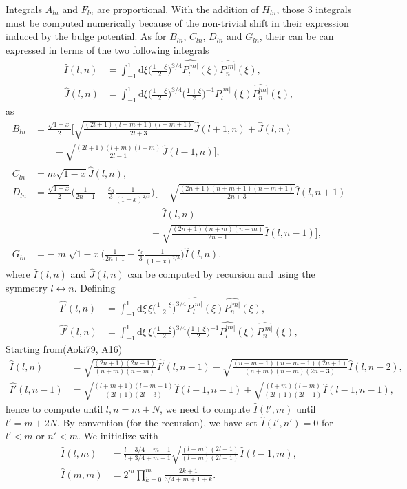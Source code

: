 \documentclass[11pt]{article}
\newcommand{\rd}{\mathrm{d}}
\newcommand{\Pnm}{P_n^{|m|}}
\newcommand{\Plm}{P_l^{|m|}}
\newcommand{\hPnm}{\widehat{\Pnm}}
\newcommand{\hPlm}{\widehat{\Plm}}
\newcommand{\hI}{\widehat{I}}
\newcommand{\hJ}{\widehat{J}}
\newcommand{\hIp}{\widehat{I'}}
\newcommand{\hJp}{\widehat{J'}}
\begin{document}
Integrals $A_{ln}$ and  $F_{ln}$ are proportional. With the addition of $H_{ln}$, those 3 integrals must be computed numerically because of the non-trivial shift in their expression induced by the bulge potential. As for $B_{ln}$, $C_{ln}$, $D_{ln}$ and $G_{ln}$, their can be can expressed in terms of the two following integrals 
\begin{align}
\hI(l,n) &= \int_{-1}^{1} \rd \xi  \bigg(\frac{1-\xi}{2}\bigg)^{3/4} \hPlm(\xi)  \hPnm(\xi), \\
\hJ(l,n) &= \int_{-1}^{1} \rd \xi  \bigg(\frac{1-\xi}{2}\bigg)^{3/4}  \bigg(\frac{1+\xi}{2}\bigg)^{-1}\hPlm(\xi)  \hPnm(\xi) ,
\end{align}
as
\begin{align}
B_{ln} &= \frac{\sqrt{1-x}}{2} \bigg[ \sqrt{\frac{(2l+1)(l+m+1)(l-m+1)}{2l+3}} \hJ(l+1,n)+ \hJ(l,n)\\
&\quad \quad  -\sqrt{\frac{(2l+1)(l+m)(l-m)}{2l-1}} \hJ(l-1,n)\bigg] ,\\
C_{ln} &= m\sqrt{1-x} \hJ(l,n) ,\\
D_{ln} &= \frac{\sqrt{1-x}}{2}  \bigg(\frac{1}{2n+1}-\frac{\varepsilon_0}{3}  \frac{1}{(1-x)^{2/3}} \bigg)
\bigg[ -\sqrt{\frac{(2n+1)(n+m+1)(n-m+1)}{2n+3}} \hI(l,n+1) \\
&\quad \quad \quad \quad \quad \quad\quad \quad\quad \quad \quad \quad- \hI(l,n) \\
&\quad \quad \quad \quad \quad \quad\quad \quad\quad \quad \quad \quad  +\sqrt{\frac{(2n+1)(n+m)(n-m)}{2n-1}} \hI(l,n-1)\bigg] ,\\
G_{ln} &= -|m| \sqrt{1-x}\bigg(\frac{1}{2n+1}-\frac{\varepsilon_0}{3}  \frac{1}{(1-x)^{2/3}} \bigg)  \hI(l,n) .
\end{align}
where $\hI(l,n)$ and $\hJ(l,n)$ can be computed by recursion and using the symmetry $l\leftrightarrow n$. Defining
\begin{align}
\hIp(l,n) &= \int_{-1}^{1} \rd \xi \, \xi \bigg(\frac{1-\xi}{2}\bigg)^{3/4} \hPlm(\xi)  \hPnm(\xi), \\
\hJp(l,n) &= \int_{-1}^{1} \rd \xi \, \xi \bigg(\frac{1-\xi}{2}\bigg)^{3/4}  \bigg(\frac{1+\xi}{2}\bigg)^{-1}\hPlm(\xi)  \hPnm(\xi) ,
\end{align}
Starting from(Aoki79, A16)
\begin{align}
\hI(l,n) &= \sqrt{\frac{(2n+1)(2n-1)}{(n+m)(n-m)}} \hIp(l,n-1)-\sqrt{\frac{(n+m-1)(n-m-1)(2n+1)}{(n+m)(n-m)(2n-3)}} \hI(l,n-2) ,\\
\hIp(l,n-1) &= \sqrt{\frac{(l+m+1)(l-m+1)}{(2l+1)(2l+3)}} \hI(l+1,n-1)+\sqrt{\frac{(l+m)(l-m)}{(2l+1)(2l-1)}} \hI(l-1,n-1) ,
\end{align}
hence to compute until $l,n=m+N$, we need to compute $\hI(l',m)$ until $l'=m+2N$. By convention (for the recursion), we have set $\hI(l',n')=0$ for $l'<m$ or  $n'<m$.
We initialize with
\begin{align}
\hI(l,m) &= \frac{l-3/4-m-1}{l+3/4+m+1} \sqrt{\frac{(l+m)(2l+1)}{(l-m)(2l-1)}} \hI(l-1,m) ,\\
\hI(m,m) &= 2^m \prod_{k=0}^{m} \frac{2k+1}{3/4 + m + 1 + k} .
\end{align}
\end{document}
